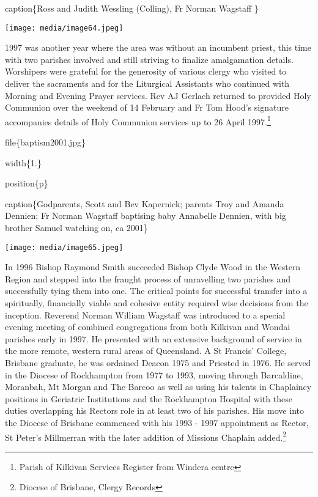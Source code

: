 caption\{Ross and Judith Wessling (Colling), Fr Norman Wagstaff \}

\texttt{[image: media/image64.jpeg]}

1997 was another year where the area was without an incumbent priest, this time with two parishes involved and still striving to finalize amalgamation details. Worshipers were grateful for the generosity of various clergy who visited to deliver the sacraments and for the Liturgical Assistants who continued with Morning and Evening Prayer services. Rev AJ Gerlach returned to provided Holy Communion over the weekend of 14 February and Fr Tom Hood's signature accompanies details of Holy Communion services up to 26 April 1997.\footnote{Parish of Kilkivan Services Register from Windera centre}

file\{baptism2001.jpg\}

width\{1.\}

position\{p\}

caption\{Godparents, Scott and Bev Kapernick; parents Troy and Amanda Dennien; Fr Norman Wagstaff baptising baby Annabelle Dennien, with big brother Samuel watching on, ca 2001\}

\texttt{[image: media/image65.jpeg]}

In 1996 Bishop Raymond Smith succeeded Bishop Clyde Wood in the Western Region and stepped into the fraught process of unravelling two parishes and successfully tying them into one. The critical points for successful transfer into a spiritually, financially viable and cohesive entity required wise decisions from the inception. Reverend Norman William Wagstaff was introduced to a special evening meeting of combined congregations from both Kilkivan and Wondai parishes early in 1997. He presented with an extensive background of service in the more remote, western rural areas of Queensland. A St Francis' College, Brisbane graduate, he was ordained Deacon 1975 and Priested in 1976. He served in the Diocese of Rockhampton from 1977 to 1993, moving through Barcaldine, Moranbah, Mt Morgan and The Barcoo as well as using his talents in Chaplaincy positions in Geriatric Institutions and the Rockhampton Hospital with these duties overlapping his Rectors role in at least two of his parishes. His move into the Diocese of Brisbane commenced with his 1993 - 1997 appointment as Rector, St Peter's Millmerran with the later addition of Missions Chaplain added.\footnote{Diocese of Brisbane, Clergy Records}

